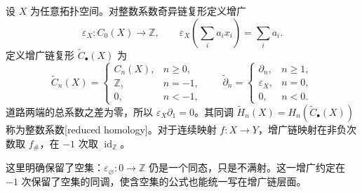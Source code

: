 \begin{definition}[约化奇异同调]\label{g2:def:reduced-homology}
	设 \(X\) 为任意拓扑空间。对整数系数奇异链复形定义增广
	\[
		\varepsilon_X:C_0(X)\longrightarrow\mathbb Z,\qquad
		\varepsilon_X\left(\sum_i a_ix_i\right)=\sum_i a_i.
	\]
	定义增广链复形 \(\widetilde C_\bullet(X)\) 为
	\[
		\widetilde C_n(X)=
		\begin{cases}
			C_n(X),&n\ge0,\\
			\mathbb Z,&n=-1,\\
			0,&n<-1,
		\end{cases}
		\qquad
		\widetilde\partial_n=
		\begin{cases}
			\partial_n,&n\ge1,\\
			\varepsilon_X,&n=0,\\
			0,&n<0.
		\end{cases}
	\]
	道路两端的总系数之差为零，所以 \(\varepsilon_X\partial_1=0\)。其同调 \(\widetilde H_n(X)=H_n(\widetilde C_\bullet(X))\) 称为整数系数[reduced homology]。对于连续映射 \(f:X\to Y\)，增广链映射在非负次数取 \(f_\#\)，在 \(-1\) 次取 \(\operatorname{id}_{\mathbb Z}\)。
\end{definition}

这里明确保留了空集：\(\varepsilon_\varnothing:0\to\mathbb Z\) 仍是一个同态，只是不满射。这一增广约定在 \(-1\) 次保留了空集的同调，使含空集的公式也能统一写在增广链层面。

